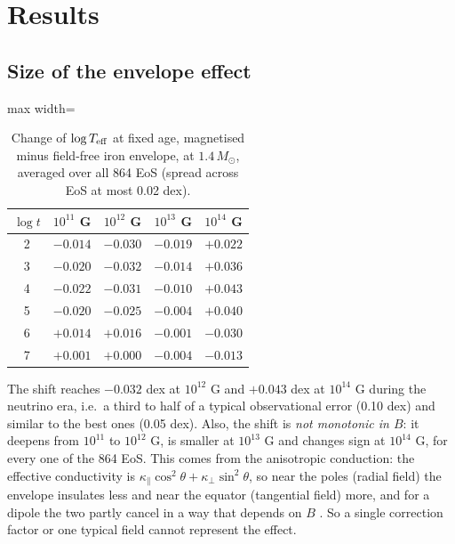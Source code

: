 \documentclass[11pt,a4paper]{article}
\newcommand{\Teff}{T_{\rm eff}}
\newcommand{\Msun}{M_\odot}
\begin{document}
\section{Results}
\subsection{Size of the envelope effect}
\begin{table}[h]
\centering
\caption{Change of $\log\Teff$ at fixed age, magnetised minus field-free iron envelope, at $1.4\,\Msun$, averaged over all 864 EoS (spread across EoS at most 0.02 dex).}\label{tab:shift}
\begin{adjustbox}{max width=\linewidth}
\begin{tabular}{ccccc}
\toprule
$\log t$ & $10^{11}$ G & $10^{12}$ G & $10^{13}$ G & $10^{14}$ G\\
\midrule
2 & $-0.014$ & $-0.030$ & $-0.019$ & $+0.022$\\
3 & $-0.020$ & $-0.032$ & $-0.014$ & $+0.036$\\
4 & $-0.022$ & $-0.031$ & $-0.010$ & $+0.043$\\
5 & $-0.020$ & $-0.025$ & $-0.004$ & $+0.040$\\
6 & $+0.014$ & $+0.016$ & $-0.001$ & $-0.030$\\
7 & $+0.001$ & $+0.000$ & $-0.004$ & $-0.013$\\
\bottomrule
\end{tabular}
\end{adjustbox}
\end{table}
The shift reaches $-0.032$ dex at $10^{12}$ G and $+0.043$ dex at $10^{14}$ G during the neutrino era, i.e.\ a third to half of a typical observational error (0.10 dex) and similar to the best ones (0.05 dex). Also, the shift is \emph{not monotonic in $B$}: it deepens from $10^{11}$ to $10^{12}$ G, is smaller at $10^{13}$ G and changes sign at $10^{14}$ G, for every one of the 864 EoS. This comes from the anisotropic conduction: the effective conductivity is $\kappa_\parallel\cos^2\theta+\kappa_\perp\sin^2\theta$, so near the poles (radial field) the envelope insulates less and near the equator (tangential field) more, and for a dipole the two partly cancel in a way that depends on $B$ \cite{PY2001}. So a single correction factor or one typical field cannot represent the effect.
\end{document}
